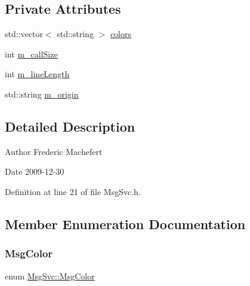 \subsection*{Private Attributes}
\begin{DoxyCompactItemize}
\item 
std\+::vector$<$ std\+::string $>$ \hyperlink{classMsgSvc_abcd0a0eab83f97f7638bbcca4f69e950}{colors}
\item 
int \hyperlink{classMsgSvc_ab22aa5d8130cbb94246c4192440d41fb}{m\+\_\+call\+Size}
\item 
int \hyperlink{classMsgSvc_a63c500a8e8573e6e68e0c2966920ddaa}{m\+\_\+line\+Length}
\item 
std\+::string \hyperlink{classMsgSvc_a2bf08fec17ae56486896dc6934528442}{m\+\_\+origin}
\end{DoxyCompactItemize}


\subsection{Detailed Description}
\begin{DoxyAuthor}{Author}
Frederic Machefert 
\end{DoxyAuthor}
\begin{DoxyDate}{Date}
2009-\/12-\/30 
\end{DoxyDate}


Definition at line 21 of file Msg\+Svc.\+h.



\subsection{Member Enumeration Documentation}
\mbox{\label{classMsgSvc_af95de99b5b2e7b6754b6d94ec5526d2c}} 
\subsubsection{\texorpdfstring{Msg\+Color}{MsgColor}}
{\footnotesize\ttfamily enum \hyperlink{classMsgSvc_af95de99b5b2e7b6754b6d94ec5526d2c}{Msg\+Svc\+::\+Msg\+Color}}

